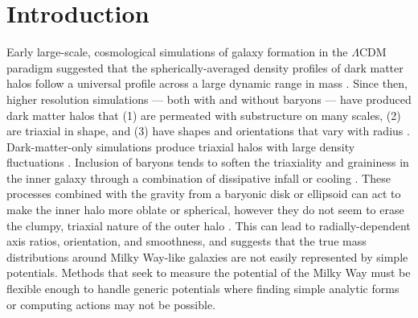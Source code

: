 \documentclass[letterpaper,12pt,preprint]{aastex}
\begin{document}

\section{Introduction}\label{sec:intro}

Early large-scale, cosmological simulations of galaxy formation in the $\Lambda$CDM paradigm suggested that the spherically-averaged density profiles of dark matter halos follow a universal profile across a large dynamic range in mass \citep{navarro96}. Since then, higher resolution simulations --- both with and without baryons --- have produced dark matter halos that (1) are permeated with substructure on many scales, (2) are triaxial in shape, and (3) have shapes and orientations that vary with radius \citep{dubinski91, jing02, kuhlen07, veraciro11}. Dark-matter-only simulations produce triaxial halos \citep{jing02} with large density fluctuations \citep{zemp09}. Inclusion of baryons tends to soften the triaxiality and graininess in the inner galaxy through a combination of dissipative infall \citep{dubinski94} or cooling \citep{bryan13}. These processes combined with the gravity from a baryonic disk or ellipsoid can act to make the inner halo more oblate or spherical, however they do not seem to erase the clumpy, triaxial nature of the outer halo \citep[e.g.,][]{pontzen12}. This can lead to radially-dependent axis ratios, orientation, and smoothness, and suggests that the true mass distributions around Milky Way-like galaxies are not easily represented by simple potentials. Methods that seek to measure the potential of the Milky Way must be flexible enough to handle generic potentials where finding simple analytic forms or computing actions may not be possible.
\end{document}
